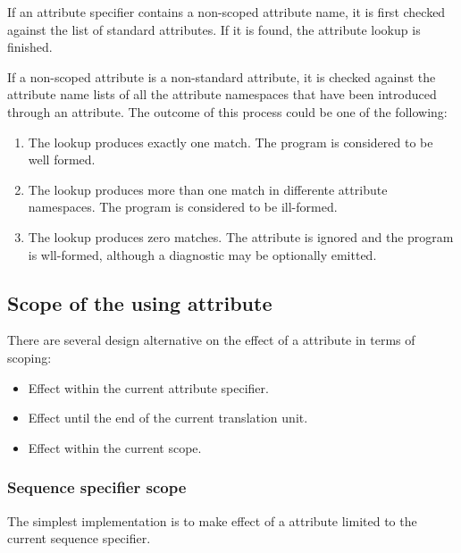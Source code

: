If an attribute specifier contains a non-scoped attribute name, it is
first checked against the list of standard attributes. If it is found,
the attribute lookup is finished.

If a non-scoped attribute is a non-standard attribute, it is checked
against the attribute name lists of all the attribute namespaces that have been
introduced through an  attribute. The outcome of this process
could be one of the following:

\begin{enumerate}

\item The lookup produces exactly one match. The program is considered
to be well formed.

\item The lookup produces more than one match in differente attribute namespaces.
The program is considered to be ill-formed.

\item The lookup produces zero matches. The attribute is ignored and the
program is wll-formed, although a diagnostic may be optionally emitted.

\end{enumerate}

\subsection{Scope of the using attribute}

There are several design alternative on the effect of a 
attribute in terms of scoping:

\begin{itemize}

\item Effect within the current attribute specifier.
\item Effect until the end of the current translation unit.
\item Effect within the current scope.

\end{itemize}

\subsubsection{Sequence specifier scope}

The simplest implementation is to make effect of a  attribute
limited to the current sequence specifier.

